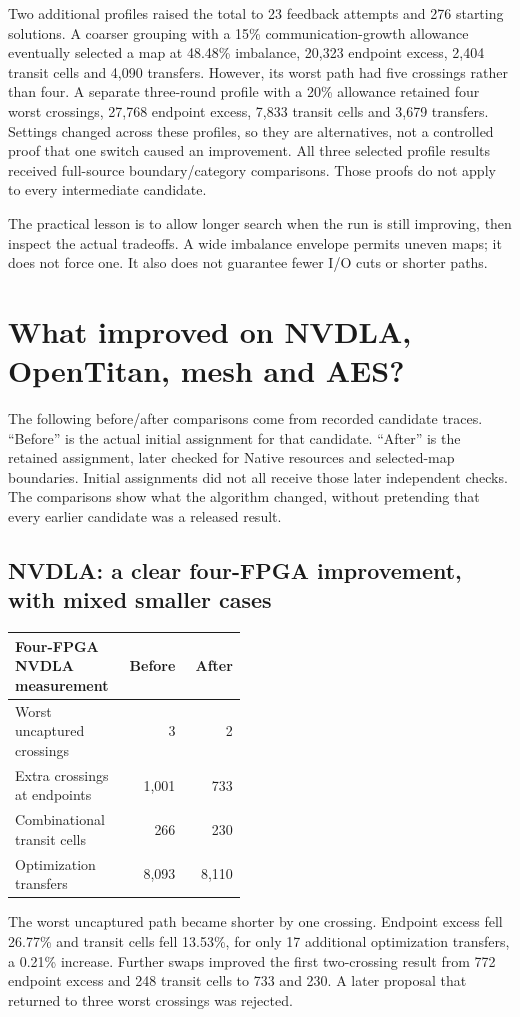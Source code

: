 \documentclass[11pt]{article}
\begin{document}
Two additional profiles raised the total to 23 feedback attempts and 276 starting solutions. A coarser grouping with a 15\% communication-growth allowance eventually selected a map at 48.48\% imbalance, 20,323 endpoint excess, 2,404 transit cells and 4,090 transfers. However, its worst path had five crossings rather than four. A separate three-round profile with a 20\% allowance retained four worst crossings, 27,768 endpoint excess, 7,833 transit cells and 3,679 transfers. Settings changed across these profiles, so they are alternatives, not a controlled proof that one switch caused an improvement. All three selected profile results received full-source boundary/category comparisons. Those proofs do not apply to every intermediate candidate.

The practical lesson is to allow longer search when the run is still improving, then inspect the actual tradeoffs. A wide imbalance envelope permits uneven maps; it does not force one. It also does not guarantee fewer I/O cuts or shorter paths.

\section{What improved on NVDLA, OpenTitan, mesh and AES?}

The following before/after comparisons come from recorded candidate traces. ``Before'' is the actual initial assignment for that candidate. ``After'' is the retained assignment, later checked for Native resources and selected-map boundaries. Initial assignments did not all receive those later independent checks. The comparisons show what the algorithm changed, without pretending that every earlier candidate was a released result.

\subsection{NVDLA: a clear four-FPGA improvement, with mixed smaller cases}

\begin{center}\small
\begin{tabular}{p{0.46\linewidth}rr}
\toprule
Four-FPGA NVDLA measurement & Before & After\\
\midrule
Worst uncaptured crossings & 3 & 2\\
Extra crossings at endpoints & 1,001 & 733\\
Combinational transit cells & 266 & 230\\
Optimization transfers & 8,093 & 8,110\\
\bottomrule
\end{tabular}
\end{center}
The worst uncaptured path became shorter by one crossing. Endpoint excess fell 26.77\% and transit cells fell 13.53\%, for only 17 additional optimization transfers, a 0.21\% increase. Further swaps improved the first two-crossing result from 772 endpoint excess and 248 transit cells to 733 and 230. A later proposal that returned to three worst crossings was rejected.
\end{document}
